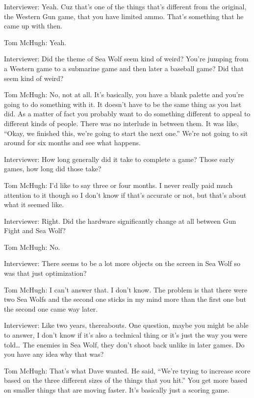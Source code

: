 \textcolor{interviewer}{Interviewer:} Yeah. Cuz that’s one of the things that’s different from the original, the Western Gun game, that you have limited ammo. That’s something that he came up with then.

\textcolor{interviewee}{Tom McHugh:} Yeah.

\textcolor{interviewer}{Interviewer:} Did the theme of Sea Wolf seem kind of weird? You’re jumping from a Western game to a submarine game and then later a baseball game? Did that seem kind of weird?

\textcolor{interviewee}{Tom McHugh:} No, not at all. It’s basically, you have a blank palette and you’re going to do something with it. It doesn’t have to be the same thing as you last did. As a matter of fact you probably want to do something different to appeal to different kinds of people. There was no interlude in between them. It was like, “Okay, we finished this, we’re going to start the next one.” We’re not going to sit around for six months and see what happens.

\textcolor{interviewer}{Interviewer:} How long generally did it take to complete a game? Those early games, how long did those take?

\textcolor{interviewee}{Tom McHugh:} I’d like to say three or four months. I never really paid much attention to it though so I don’t know if that’s accurate or not, but that’s about what it seemed like.

\textcolor{interviewer}{Interviewer:} Right. Did the hardware significantly change at all between Gun Fight and Sea Wolf?

\textcolor{interviewee}{Tom McHugh:} No.

\textcolor{interviewer}{Interviewer:} There seems to be a lot more objects on the screen in Sea Wolf so was that just optimization?

\textcolor{interviewee}{Tom McHugh:} I can’t answer that. I don’t know. The problem is that there were two Sea Wolfs and the second one sticks in my mind more than the first one but the second one came way later.

\textcolor{interviewer}{Interviewer:} Like two years, thereabouts. One question, maybe you might be able to answer, I don’t know if it’s also a technical thing or it’s just the way you were told… The enemies in Sea Wolf, they don’t shoot back unlike in later games. Do you have any idea why that was?

\textcolor{interviewee}{Tom McHugh:} That’s what Dave wanted. He said, “We’re trying to increase score based on the three different sizes of the things that you hit.” You get more based on smaller things that are moving faster. It’s basically just a scoring game.

